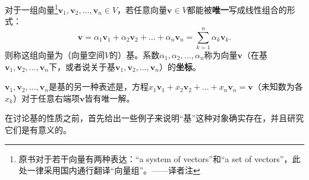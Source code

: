 \begin{definition}
    对于一组向量\footnote{原书对于若干向量有两种表达：“a system of vectors”和“a set of vectors”，此处一律采用国内通行翻译“向量组”。——译者注}$\mathbf{v}_{1},\mathbf{v}_{2},\ldots,\mathbf{v}_{n}\in V$，若任意向量$\mathbf{v}\in V$都能被{\bf 唯一}写成线性组合的形式：\[\mathbf{v}=\alpha_1\mathbf{v}_1+\alpha_2\mathbf{v}_2+\ldots+\alpha_n\mathbf{v}_n=\sum_{k=1}^n\alpha_k\mathbf{v}_k.\]
    则称这组向量为（向量空间$V$的）基。系数$\alpha_1,\alpha_2,\dots,\alpha_n$称为向量$\mathbf{v}$（在基$\mathbf{v}_{1},\mathbf{v}_{2},\ldots,\mathbf{v}_{n}$下，或者说关于基$\mathbf{v}_{1},\mathbf{v}_{2},\ldots,\mathbf{v}_{n}$）的{\bf 坐标}。

    $\mathbf{v}_{1},\mathbf{v}_{2},\ldots,\mathbf{v}_{n}$是基的另一种表述是，方程$x_{1}\mathbf{v}_{1}+x_{2}\mathbf{v}_{2}+\ldots+x_{n}\mathbf{v}_{n}=\mathbf{v}$（未知数为各$x_k$）对于任意右端项$\mathbf{v}$皆有唯一解。
\end{definition}

在讨论基的性质之前，首先给出一些例子来说明“基”这种对象确实存在，并且研究它们是有意义的。

